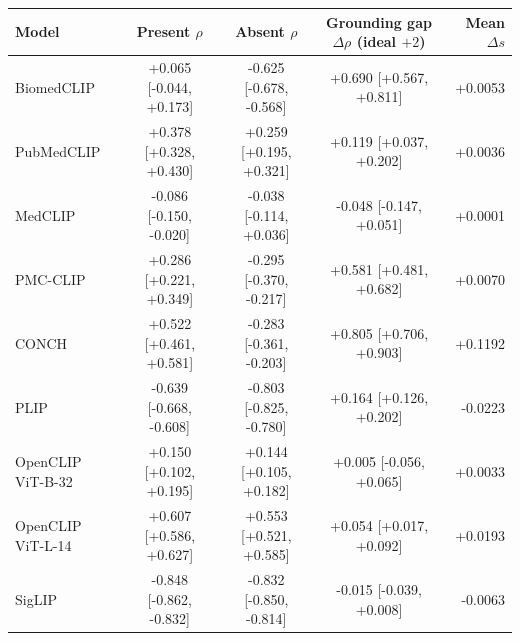 \begin{tabular}{lcccr}
\toprule
Model & Present $\rho$ & Absent $\rho$ & Grounding gap $\Delta\rho$ (ideal $+2$) & Mean $\Delta s$ \\
\midrule
BiomedCLIP & +0.065 [-0.044, +0.173] & -0.625 [-0.678, -0.568] & +0.690 [+0.567, +0.811] & +0.0053 \\
PubMedCLIP & +0.378 [+0.328, +0.430] & +0.259 [+0.195, +0.321] & +0.119 [+0.037, +0.202] & +0.0036 \\
MedCLIP & -0.086 [-0.150, -0.020] & -0.038 [-0.114, +0.036] & -0.048 [-0.147, +0.051] & +0.0001 \\
PMC-CLIP & +0.286 [+0.221, +0.349] & -0.295 [-0.370, -0.217] & +0.581 [+0.481, +0.682] & +0.0070 \\
CONCH & +0.522 [+0.461, +0.581] & -0.283 [-0.361, -0.203] & +0.805 [+0.706, +0.903] & +0.1192 \\
PLIP & -0.639 [-0.668, -0.608] & -0.803 [-0.825, -0.780] & +0.164 [+0.126, +0.202] & -0.0223 \\
OpenCLIP ViT-B-32 & +0.150 [+0.102, +0.195] & +0.144 [+0.105, +0.182] & +0.005 [-0.056, +0.065] & +0.0033 \\
OpenCLIP ViT-L-14 & +0.607 [+0.586, +0.627] & +0.553 [+0.521, +0.585] & +0.054 [+0.017, +0.092] & +0.0193 \\
SigLIP & -0.848 [-0.862, -0.832] & -0.832 [-0.850, -0.814] & -0.015 [-0.039, +0.008] & -0.0063 \\
\bottomrule
\end{tabular}
